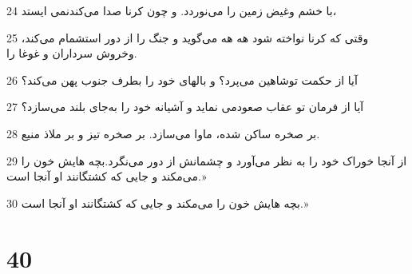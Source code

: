 \par 24 با خشم وغیض زمین را می‌نوردد. و چون کرنا صدا می‌کندنمی ایستد،
\par 25 وقتی که کرنا نواخته شود هه هه می‌گوید و جنگ را از دور استشمام می‌کند، وخروش سرداران و غوغا را.
\par 26 آیا از حکمت توشاهین می‌پرد؟ و بالهای خود را بطرف جنوب پهن می‌کند؟
\par 27 آیا از فرمان تو عقاب صعودمی نماید و آشیانه خود را به‌جای بلند می‌سازد؟
\par 28 بر صخره ساکن شده، ماوا می‌سازد. بر صخره تیز و بر ملاذ منیع.
\par 29 از آنجا خوراک خود را به نظر می‌آورد و چشمانش از دور می‌نگرد.بچه هایش خون را می‌مکند و جایی که کشتگانند او آنجا است.»
\par 30 بچه هایش خون را می‌مکند و جایی که کشتگانند او آنجا است.»

\chapter{40}

